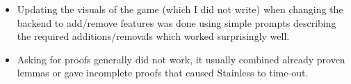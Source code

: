 \documentclass[letterpaper, 11pt]{article}
\begin{document}
\begin{itemize}
\begin{itemize}
                The library provided predefined functions for standard Scala List and Option but not
                for the Stainless's.
                A series of simple prompts with the code, error, and explanation of why the issue
                occurred solved the issue.
            \item Updating the visuals of the game (which I did not write) when changing the backend
                to add/remove features was done using simple prompts describing the required
                additions/removals which worked surprisingly well.
            \item Asking for proofs generally did not work, it usually combined already proven
                lemmas or gave incomplete proofs that caused Stainless to time-out.
        \end{itemize}
\end{itemize}

\printbibliography[heading=none]
\end{document}
